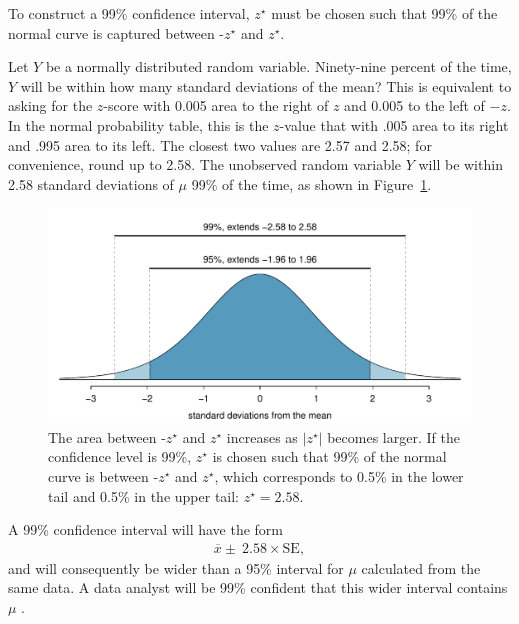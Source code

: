 \begin{spacing}{1.5}
To construct a 99\% confidence interval, $z^{\star}$ must be chosen such that 99\% of the normal curve is captured between -$z^{\star}$ and $z^{\star}$.

\begin{example}{Let $Y$ be a normally distributed random variable. Ninety-nine percent of the time, $Y$ will be within how many standard deviations of the mean?}
	This is equivalent to asking for the $z$-score with 0.005 area to the right of $z$ and 0.005 to the left of $-z$. In the normal probability table, this is the $z$-value that with .005 area to its right and .995 area to its left. The closest two values are 2.57 and 2.58; for convenience, round up to 2.58. The unobserved random variable $Y$ will be within 2.58 standard deviations of $\mu$ 99\% of the time, as shown in Figure~\ref{choosingZForCI}.
\end{example}


\begin{figure}[h]
	\centering
	\includegraphics[width=\textwidth]
	{ch_inference_foundations_oi_biostat/figures/choosingZForCI/choosingZForCI}
	\caption{The area between -$z^{\star}$ and $z^{\star}$ increases as $|z^{\star}|$ becomes larger. If the confidence level is 99\%, $z^{\star}$ is chosen such that 99\% of the normal curve is between -$z^{\star}$ and $z^{\star}$, which corresponds to 0.5\% in the lower tail and 0.5\% in the upper tail: $z^{\star}=2.58$.}
	\label{choosingZForCI}
\end{figure}
 
A 99\% confidence interval will have the form 
\begin{align}
	\overline{x} \pm \ 2.58 \times \text{SE},
\end{align}
 and will consequently be wider than a 95\% interval for $\mu$ calculated from the same data.  A data analyst will be 99\% confident that this wider interval contains $\mu$ .
 

\end{spacing}
